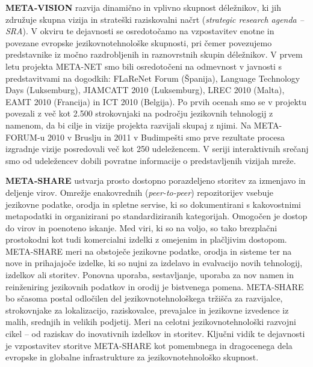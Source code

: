\begin{multicols}{2}
\textbf{META-VISION} razvija dinamično in vplivno skupnost déležnikov, ki jih združuje skupna vizija in strateški raziskovalni načrt (\textit{strategic research agenda – SRA}). V okviru te dejavnosti se osredotočamo na vzpostavitev enotne in povezane evropske jezikovnotehnološke skupnosti, pri čemer povezujemo predstavnike iz močno razdrobljenih in raznovrstnih skupin déležnikov. V prvem letu projekta META-NET smo bili osredotočeni na odmevnost v javnosti s predstavitvami na dogodkih: FLaReNet Forum (Španija), Language Technology Days (Luksemburg), JIAMCATT 2010 (Luksemburg), LREC 2010 (Malta), EAMT 2010 (Francija) in ICT 2010 (Belgija). Po prvih ocenah smo se v projektu povezali z več kot 2.500 strokovnjaki na področju jezikovnih tehnologij z namenom, da bi cilje in vizije projekta razvijali skupaj z njimi. Na META-FORUM-u 2010 v Bruslju in 2011 v Budimpešti smo prve rezultate procesa izgradnje vizije posredovali več kot 250 udeležencem. V seriji interaktivnih srečanj smo od udeležencev dobili povratne informacije o predstavljenih vizijah mreže.

\textbf{META-SHARE} ustvarja prosto dostopno porazdeljeno storitev za izmenjavo in deljenje virov. Omrežje enakovrednih (\textit{peer-to-peer}) repozitorijev vsebuje jezikovne podatke, orodja in spletne servise, ki so dokumentirani s kakovostnimi metapodatki in organizirani po standardiziranih kategorijah. Omogočen je dostop do virov in poenoteno iskanje. Med viri, ki so na voljo, so tako brezplačni prostokodni kot tudi komercialni izdelki z omejenim in plačljivim dostopom. META-SHARE meri na obstoječe jezikovne podatke, orodja in sisteme ter na nove in prihajajoče izdelke, ki so nujni za izdelavo in evalvacijo novih tehnologij, izdelkov ali storitev. Ponovna uporaba, sestavljanje, uporaba za nov namen in reinženiring jezikovnih podatkov in orodij je bistvenega pomena. META-SHARE bo sčasoma postal odločilen del jezikovnotehnološkega tržišča za razvijalce, strokovnjake za lokalizacijo, raziskovalce, prevajalce in jezikovne izvedence  iz malih, srednjih in velikih podjetij. Meri na celotni jezikovnotehnološki razvojni cikel – od raziskav do inovativnih izdelkov in storitev. Ključni vidik te dejavnosti je vzpostavitev storitve META-SHARE kot pomembnega in dragocenega dela evropske in globalne infrastrukture za jezikovnotehnološko skupnost.


\end{multicols}
